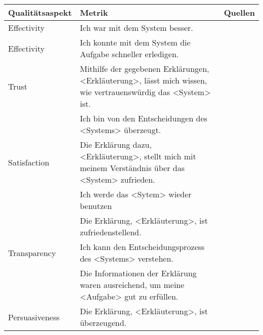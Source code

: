 \begin{table}
    \begin{center}
        \begin{tabular}{|p{} p{} p{}|}
            \hline
            \textbf{Qualitätsaspekt} & \textbf{Metrik} & \textbf{Quellen} \\
            \hline
            \hline
            Effectivity     & Ich war mit dem System besser.
                                & \cite[vgl.][]{balog_measuring_2020} \\
            \hline
            Effectivity     & Ich konnte mit dem System die Aufgabe schneller erledigen.
                                & \cite[vgl.][]{balog_measuring_2020} \\
            \hline
            Trust           & Mithilfe der gegebenen Erklärungen, <Erkläuterung>, lässt mich wissen, wie             
                                vertrauenswürdig das <System> ist.
                                & \cite[vgl.][]{hoffman_metrics_nodate, balog_measuring_2020, weitz_you_2019} \\
                            & Ich bin von den Entscheidungen des <Systems> überzeugt.
                                & \cite[vgl.][]{tsai_effects_2020} \\
            \hline
            Satisfaction    & Die Erklärung dazu, <Erkläuterung>, stellt mich mit meinem
                                Verständnis über das <System> zufrieden.
                                & \cite[vgl.][]{riveiro_thats_2021} \\
                            & Ich werde das <Sytem> wieder benutzen
                                & \cite{balog_measuring_2020} \\
                            & Die Erklärung, <Erkläuterung>, ist zufriedenstellend.
                                & \cite[vgl.][]{riveiro_thats_2021, hoffman_metrics_nodate, balog_measuring_2020} \\
            \hline
            Transparency    & Ich kann den Entscheidungsprozess des <Systems> verstehen.
                                & \cite{wang_is_2018, balog_measuring_2020} \\
                            & Die Informationen der Erklärung waren ausreichend, um meine <Aufgabe> gut zu erfüllen. 
                                & \cite{wang_is_2018, balog_measuring_2020} \\
            \hline
            Persuasiveness  & Die Erklärung, <Erkläuterung>, ist überzeugend.

\end{tabular}
\end{center}
\end{table}
